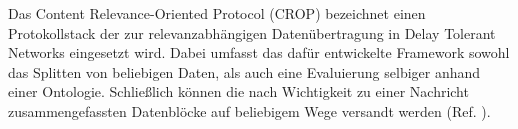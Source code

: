 Das Content Relevance-Oriented Protocol (CROP) bezeichnet einen Protokollstack
der zur relevanzabh{\"a}ngigen Daten{\"u}bertragung in Delay Tolerant Networks
eingesetzt wird. Dabei umfasst das daf{\"u}r entwickelte Framework sowohl das
Splitten von beliebigen Daten, als auch eine Evaluierung selbiger anhand einer
Ontologie. Schlie{\ss}lich k{\"o}nnen die nach Wichtigkeit zu einer Nachricht
zusammengefassten Datenbl{\"o}cke auf beliebigem Wege versandt werden (Ref.
\cite{Daher}).

